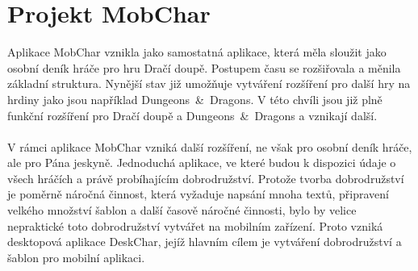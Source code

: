 \documentclass[thesis=B,czech]{resources/FITthesis}[2012/06/26]
\begin{document}
	\section{Projekt MobChar}	
Aplikace MobChar vznikla jako samostatná aplikace, která měla sloužit jako osobní deník hráče pro hru Dračí doupě. Postupem času se rozšiřovala a měnila základní struktura. Nynější stav již umožňuje vytváření rozšíření pro další hry na hrdiny jako jsou například Dungeons~\&~Dragons. V této chvíli jsou již plně funkční rozšíření pro Dračí doupě a Dungeons~\&~Dragons a vznikají další.\\
\\
V rámci aplikace MobChar vzniká další rozšíření, ne však pro osobní deník hráče, ale pro Pána jeskyně. Jednoduchá aplikace, ve které budou k dispozici údaje o všech hráčích a právě probíhajícím dobrodružství. Protože tvorba dobrodružství je poměrně náročná činnost, která vyžaduje napsání mnoha textů, připravení velkého množství šablon a další časově náročné činnosti, bylo by velice nepraktické toto dobrodružství vytvářet na mobilním zařízení. Proto vzniká desktopová aplikace DeskChar, jejíž hlavním cílem je vytváření dobrodružství a šablon pro mobilní aplikaci.
\end{document}
